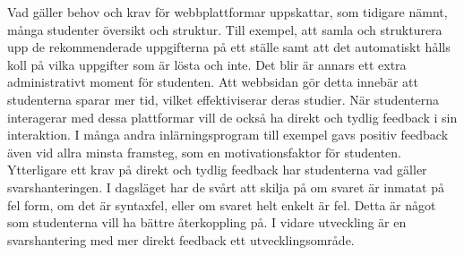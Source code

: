 Vad gäller behov och krav för webbplattformar uppskattar, som tidigare nämnt, många studenter översikt och struktur. Till exempel, att samla och strukturera upp de rekommenderade uppgifterna på ett ställe samt att det automatiskt hålls koll på vilka uppgifter som  är lösta och inte. Det blir är annars ett extra administrativt moment för studenten. Att webbsidan gör detta innebär att studenterna sparar mer tid, vilket effektiviserar deras studier. När studenterna interagerar med dessa plattformar vill de också ha direkt och tydlig feedback i sin interaktion. I många andra inlärningsprogram till exempel gavs positiv feedback även vid allra minsta framsteg, som en motivationsfaktor för studenten. Ytterligare ett krav på direkt och tydlig feedback har studenterna vad gäller svarshanteringen. I dagsläget har de svårt att skilja på om svaret är inmatat på fel form, om det är syntaxfel, eller om svaret helt enkelt är fel. Detta är något som studenterna vill ha bättre återkoppling på. I vidare utveckling är en svarshantering med mer direkt feedback ett utvecklingsområde. 


